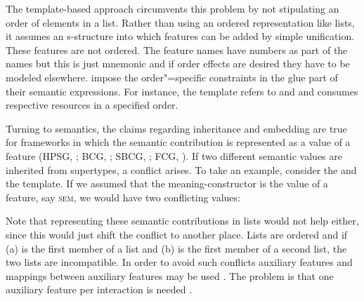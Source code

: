 The template-based approach circumvents this problem by not stipulating an order of elements in a
list. Rather than using an ordered representation like lists, it assumes an s-structure into which
features can be added by simple unification. These features are not ordered. The feature names have
numbers as part of the names but this is just mnemonic and if order effects are desired they have to
be modeled elsewhere. \citet{AGT2014a} impose the order"=specific constraints in the glue part of their semantic expressions. For
instance, the  template refers to \argtwo and \argthree and consumes
respective resources in a specified order.

Turning to semantics, the claims regarding inheritance and embedding are true for frameworks in which
the semantic contribution is represented as a value of a feature (HPSG, \citealt{ps2,Sag97a}; BCG,
\citealt{KF99a}; SBCG, \citealt{Sag2012a}; FCG, \citealt{SteelsFluid-ed}). If two different semantic values are inherited from
supertypes, a conflict arises. To take an example, consider the  and the
 template. If we assumed that the meaning-constructor is the value of a feature,
say \textsc{sem}, we would have two conflicting values:
\eal
\ex {}
\ex {}
\zl


Note that representing these semantic contributions in lists would not help either, since this would
just shift the conflict to another place. Lists are ordered and if (a) is the first member of
a list and (b) is the first member of a second list, the two lists are incompatible. 
In order to avoid such conflicts auxiliary features and mappings
between auxiliary features may be used \citep{Koenig99a}. The problem is that one auxiliary feature
per interaction is needed \citep[Section~7.5.2.2]{MuellerLehrbuch1}.

